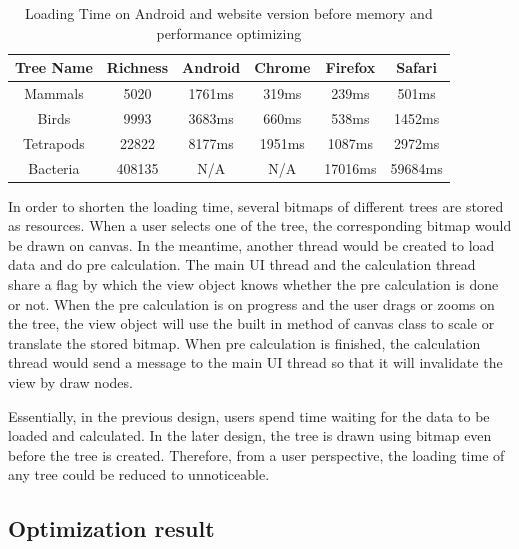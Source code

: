 \documentclass[a4paper,11pt,twoside]{report}
\begin{document}
\begin{table} [H]
	\centering %
	\begin{tabular}{|c c c c c c|} %
		\hline %
		Tree Name & Richness  & Android & Chrome & Firefox & Safari\\%
		\hline  %
		Mammals & 5020 & 1761ms & 319ms & 239ms & 501ms \\  %
		\hline
		Birds & 9993 & 3683ms & 660ms & 538ms & 1452ms \\
		\hline
		Tetrapods & 22822 & 8177ms & 1951ms & 1087ms & 2972ms\\ 
		\hline %
		Bacteria & 408135 & N/A & N/A & 17016ms  & 59684ms\\ [1ex] %
		\hline
	\end{tabular}
	\label{table:nonlin} %
	\caption{Loading Time on Android and website version before memory and performance optimizing} %
\end{table}

In order to shorten the loading time, several bitmaps of different trees are stored as resources. When a user selects one of the tree, the corresponding bitmap would be drawn on canvas. In the meantime, another thread would be created to load data and do pre calculation. The main UI thread and the calculation thread share a flag by which the view object knows whether the pre calculation is done or not. When the pre calculation is on progress and the user drags or zooms on the tree, the view object will use the built in method of canvas class to scale or translate the stored bitmap. When pre calculation is finished, the calculation thread would send a message to the main UI thread so that it will invalidate the view by draw nodes.

Essentially, in the previous design, users spend time waiting for the data to be loaded and calculated. In the later design, the tree is drawn using bitmap even before the tree is created. Therefore, from a user perspective, the loading time of any tree could be reduced to unnoticeable. 


\subsection{Optimization result}
\end{document}
